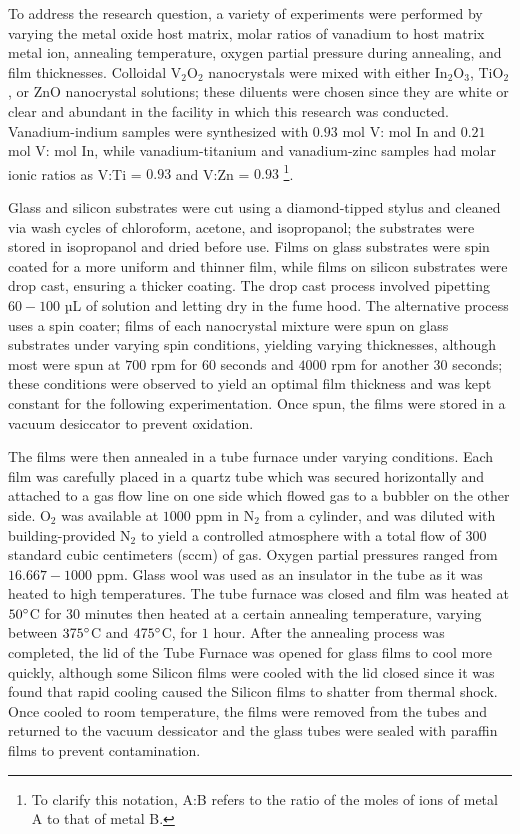 \documentclass[a4paper]{article}
\begin{document}
To address the research question, a variety of experiments were performed by varying the metal oxide host matrix, molar ratios of vanadium to host matrix metal ion, annealing temperature, oxygen partial pressure during annealing, and film thicknesses. Colloidal V$_2$O$_2$ nanocrystals were mixed with either In$_2$O$_3$, TiO$_2$, or ZnO nanocrystal solutions; these diluents were chosen since they are white or clear and abundant in the facility in which this research was conducted. Vanadium-indium samples were synthesized with $0.93$ mol V: mol In and $0.21$ mol V: mol In, while vanadium-titanium and vanadium-zinc samples had molar ionic ratios as V:Ti = $0.93$ and V:Zn = $0.93$ \footnote{To clarify this notation, A:B refers to the ratio of the moles of ions of metal A to that of metal B.}. 

Glass and silicon substrates were cut using a diamond-tipped stylus and cleaned via wash cycles of chloroform, acetone, and isopropanol; the substrates were stored in isopropanol and dried before use. Films on glass substrates were spin coated for a more uniform and thinner film, while films on silicon substrates were drop cast, ensuring a thicker coating. The drop cast process involved pipetting $60-100$ µL of solution and letting dry in the fume hood. The alternative process uses a spin coater; films of each nanocrystal mixture were spun on glass substrates under varying spin conditions, yielding varying thicknesses, although most were spun at $700$ rpm for $60$ seconds and $4000$ rpm for another $30$ seconds; these conditions were observed to yield an optimal film thickness and was kept constant for the following experimentation. Once spun, the films were stored in a vacuum desiccator to prevent oxidation. 
    
The films were then annealed in a tube furnace under varying conditions. Each film was carefully placed in a quartz tube which was secured horizontally and attached to a gas flow line on one side which flowed gas to a bubbler on the other side. O$_2$ was available at $1000$ ppm in N$_2$ from a cylinder, and was diluted with building-provided N$_2$ to yield a controlled atmosphere with a total flow of $300$ standard cubic centimeters (sccm) of gas. Oxygen partial pressures ranged from $16.667-1000$ ppm. Glass wool was used as an insulator in the tube as it was heated to high temperatures. The tube furnace was closed and film was heated at $50\degree$C for $30$ minutes then heated at a certain annealing temperature, varying between $375\degree $C and $475\degree $C, for $1$ hour. After the annealing process was completed, the lid of the Tube Furnace was opened for glass films to cool more quickly, although some Silicon films were cooled with the lid closed since it was found that rapid cooling caused the Silicon films to shatter from thermal shock. Once cooled to room temperature, the films were removed from the tubes and returned to the vacuum dessicator and the glass tubes were sealed with paraffin films to prevent contamination. 
\end{document}
